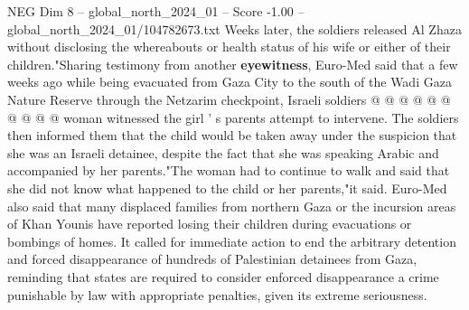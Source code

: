 \begin{textsample}{NEG Dim 8 – global\_north\_2024\_01 – Score -1.00 – global\_north\_2024\_01/104782673.txt}
Weeks later, the soldiers released Al Zhaza without disclosing the whereabouts or health status of his wife or either of their children."Sharing testimony from another \textbf{eyewitness}, Euro-Med said that a few weeks ago while being evacuated from Gaza City to the south of the Wadi Gaza Nature Reserve through the Netzarim checkpoint, Israeli soldiers @ @ @ @ @ @ @ @ @ @ woman witnessed the girl ' s parents attempt to intervene.
The soldiers then informed them that the child would be taken away under the suspicion that she was an Israeli detainee, despite the fact that she was speaking Arabic and accompanied by her parents."The woman had to continue to walk and said that she did not know what happened to the child or her parents,"it said.
Euro-Med also said that many displaced families from northern Gaza or the incursion areas of Khan Younis have reported losing their children during evacuations or bombings of homes.
It called for immediate action to end the arbitrary detention and forced disappearance of hundreds of Palestinian detainees from Gaza, reminding that states are required to consider enforced disappearance a crime punishable by law with appropriate penalties, given its extreme seriousness.

\end{textsample}
